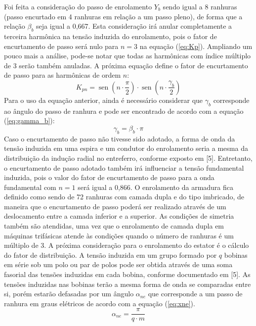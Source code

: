 \documentclass[conference]{IEEEtran}
\begin{document}
Foi feita a consideração do passo de enrolamento $Y_b$ sendo igual a 8 ranhuras (passo encurtado em 4 ranhuras em relação a um passo pleno), de forma que a relação $\beta_b$ seja igual a 0,667. Esta consideração irá anular completamente a terceira harmônica na tensão induzida do enrolamento, pois o fator de encurtamento de passo será nulo para $n=3$ na equação (\ref{eq:Kp}). Ampliando um pouco mais a análise, pode-se notar que todas as harmônicas com índice múltiplo de 3 serão também anuladas.
A próxima equação define o fator de encurtamento de passo para as harmônicas de ordem $n$:
\begin{equation}
K_{pn} = \operatorname{sen}(n\cdot\frac{\pi}{2}) \cdot \operatorname{sen}(n\cdot\frac{\gamma_b}{2})
\label{eq:Kp}
\end{equation}
Para o uso da equação anterior, ainda é necessário considerar que $\gamma_b$ corresponde ao ângulo do passo de ranhura e pode ser encontrado de acordo com a equação (\ref{eq:gamma_b}):
\begin{equation}
\gamma_b = \beta_b \cdot \pi
\label{eq:gamma_b}
\end{equation}
Caso o encurtamento de passo não tivesse sido adotado, a forma de onda da tensão induzida em uma espira e um condutor do enrolamento seria a mesma da distribuição da indução radial no  
entreferro, conforme exposto em [5]. Entretanto, o encurtamento de passo adotado também irá influenciar a tensão fundamental induzida, pois o valor do fator de encurtamento de passo para a onda fundamental com $n=1$ será igual a 0,866. O enrolamento da armadura fica definido como sendo de 72 ranhuras com camada dupla e do tipo imbricado, de maneira que o encurtamento de passo poderá ser realizado através de um deslocamento entre a camada inferior e a superior. As condições de simetria também são atendidas, uma vez que o enrolamento de camada dupla em máquinas trifásicas atende às condições quando o número de ranhuras é um múltiplo de 3. 
A próxima consideração para o enrolamento do estator é o cálculo do fator de distribuição. A tensão induzida em um grupo formado por $q$ bobinas em série sob um polo ou par de polos pode ser obtida através de uma soma fasorial das tensões induzidas em cada bobina, conforme documentado em [5]. As tensões induzidas nas bobinas terão a mesma forma de onda se comparadas entre si, porém estarão defasadas por um ângulo $\alpha_{ne}$ que corresponde a um passo de ranhura em graus elétricos de acordo com a equação (\ref{eq:xne}). 
\begin{equation}
\alpha_{ne} =\frac{\pi}{q \cdot m}
\label{eq:xne}
\end{equation}
\end{document}
